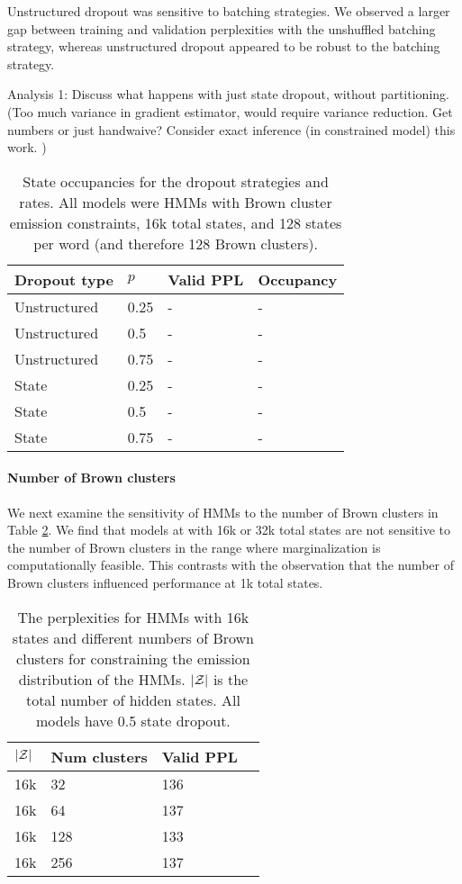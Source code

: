 \documentclass[11pt,a4paper]{article}
\begin{document}
Unstructured dropout was sensitive to batching strategies.
We observed a larger gap between training and validation perplexities
with the unshuffled batching strategy,
whereas unstructured dropout appeared to be robust to the batching strategy.

Analysis 1: Discuss what happens with just state dropout, without partitioning.
(Too much variance in gradient estimator, would require variance reduction.
Get numbers or just handwaive?
Consider exact inference (in constrained model) this work.
)

\begin{table}[!t]
\centering
\caption{\label{tbl:dropout}
State occupancies for the dropout strategies and rates.
All models were HMMs with Brown cluster emission constraints,
16k total states, and 128 states per word (and therefore 128 Brown clusters).
}

\begin{tabular}{llll}
\toprule
Dropout type & $p$  & Valid PPL & Occupancy\\
\midrule 
Unstructured & 0.25 & -         & - \\
Unstructured & 0.5  & -         & - \\
Unstructured & 0.75 & -         & - \\
State        & 0.25 & -         & - \\
State        & 0.5  & -         & - \\
State        & 0.75 & -         & - \\
\bottomrule
\end{tabular}
\end{table}

\paragraph{Number of Brown clusters}
We next examine the sensitivity of HMMs to the number of Brown clusters
in Table \ref{tbl:ppl-spw-ablation}.
We find that models at with 16k or 32k total states
are not sensitive to the number of Brown clusters
in the range where marginalization is computationally feasible.
This contrasts with the observation that the number of Brown clusters
influenced performance at 1k total states.

\begin{table}[!t]
\centering
\caption{\label{tbl:ppl-spw-ablation}
The perplexities for HMMs with 16k states
and different numbers of Brown clusters
for constraining the emission distribution of the HMMs.
$|\mathcal{Z}|$ is the total number of hidden states.
All models have 0.5 state dropout.
}

\begin{tabular}{llll}
\toprule
$|\mathcal{Z}|$ & Num clusters & Valid PPL\\
\midrule
16k      & 32           & 136\\
16k      & 64           & 137\\
16k      & 128          & 133\\
16k      & 256          & 137\\
\bottomrule
\end{tabular}
\end{table}
\end{document}
